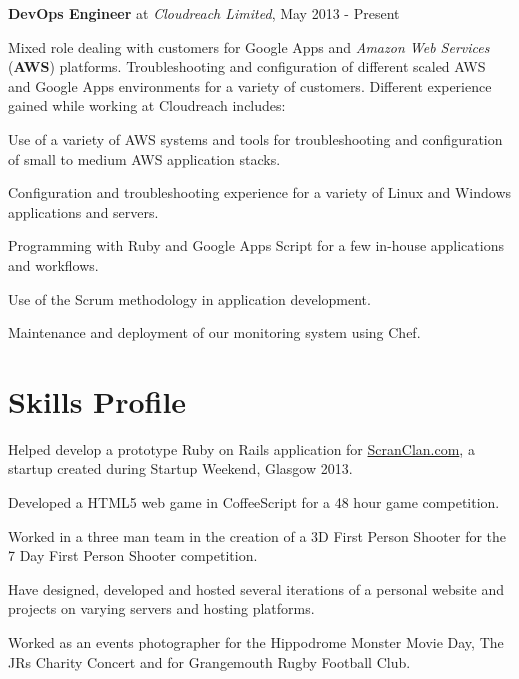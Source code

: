 \documentclass[11pt,a4paper]{article}
\renewenvironment{itemize}{
  \begin{list}{}{
    \setlength{\leftmargin}{1em}
    \setlength{\itemsep}{0.25em}
    \setlength{\parskip}{0pt}
    \setlength{\parsep}{0.25em}
    \renewcommand{\labelitemi}{$\bullet$}
  }
}{
  \end{list}
}
\begin{document}
\begin{itemize}
    \item \textbf{DevOps Engineer} at \emph{Cloudreach Limited}, May 2013 - Present

    Mixed role dealing with customers for Google Apps and \emph{Amazon Web Services} (\textbf{AWS}) platforms. Troubleshooting and configuration of different scaled AWS and Google Apps environments for a variety of customers.
    Different experience gained while working at Cloudreach includes:
    \begin{itemize}
      \item Use of a variety of AWS systems and tools for troubleshooting and configuration of small to medium AWS application stacks.
      \item Configuration and troubleshooting experience for a variety of Linux and Windows
        applications and servers.
      \item Programming with Ruby and Google Apps Script for a few in-house applications and
        workflows.
      \item Use of the Scrum methodology in application development.
      \item Maintenance and deployment of our monitoring system using Chef.
    \end{itemize}
\end{itemize}

\section*{Skills Profile}

\begin{itemize}
    \item Helped develop a prototype Ruby on Rails application for \href{http://www.ScranClan.com}{ScranClan.com}, a startup created during Startup Weekend, Glasgow 2013.
    \item Developed a HTML5 web game in CoffeeScript for a 48 hour game
        competition.
    \item Worked in a three man team in the creation of a 3D First Person Shooter
        for the 7 Day First Person Shooter competition.
    \item Have designed, developed and hosted several iterations of a personal website and projects on varying servers and hosting platforms.
    \item Worked as an events photographer for the Hippodrome Monster Movie Day, The JRs Charity Concert and for Grangemouth Rugby Football Club.
\end{itemize}
\end{document}
